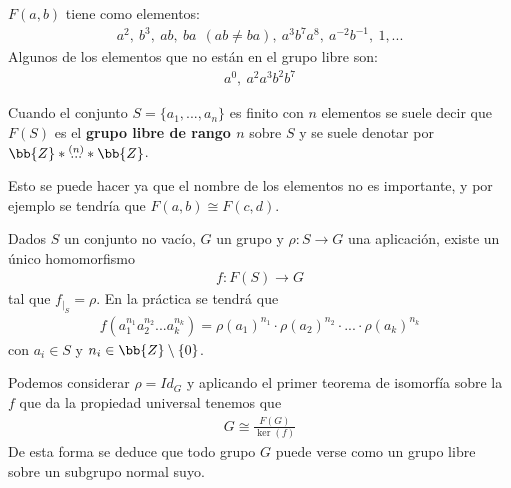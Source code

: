\begin{ejemplo}
    $F(a,b)$ tiene como elementos:
    \begin{gather*}
        a^2,\ b^3,\ ab,\ ba\ \ (ab\neq ba) ,\ a^3b^7a^8,\ a^{-2}b^{-1},\ 1,...
    \end{gather*}
    Algunos de los elementos que no están en el grupo libre son:
    \begin{gather*}
        a^0,\ a^2a^3b^2b^7
    \end{gather*}
\end{ejemplo}

\begin{definicion}
    Cuando el conjunto $S=\{a_1,...,a_n\}$ es finito con $n$ elementos se suele decir que $F(S)$ es el \textbf{grupo libre de rango $n$} sobre $S$ y se suele denotar por $\bb{Z}\ast \overset{(n)}{...} \ast \bb{Z}$.
\end{definicion}

\begin{observacion}
    Esto se puede hacer ya que el nombre de los elementos no es importante, y por ejemplo se tendría que $F(a,b)\cong F(c,d)$.
\end{observacion}

\begin{coro}
    Dados $S$ un conjunto no vacío, $G$ un grupo y $\rho : S \to G$ una aplicación, existe un único homomorfismo 
    \begin{gather*}
        f:F(S) \to G
    \end{gather*}
    tal que $f_{|_S}=\rho$. En la práctica se tendrá que 
    \begin{gather*}
        f(a_1^{n_1}a_2^{n_2}...a_k^{n_k}) = \rho(a_1)^{n_1} \cdot \rho(a_2)^{n_2} \cdot ... \cdot \rho(a_k)^{n_k} 
    \end{gather*}
    con $a_i\in S$ y $n_i\in \bb{Z}\setminus\{0\}$.
\end{coro}

\begin{observacion}
    Podemos considerar $\rho = Id_G$ y aplicando el primer teorema de isomorfía sobre la $f$ que da la propiedad universal tenemos que 
    \begin{gather*}
        G \cong \frac{F(G)}{\ker(f)}
    \end{gather*}
    De esta forma se deduce que todo grupo $G$ puede verse como un grupo libre sobre un subgrupo normal suyo.
\end{observacion}

